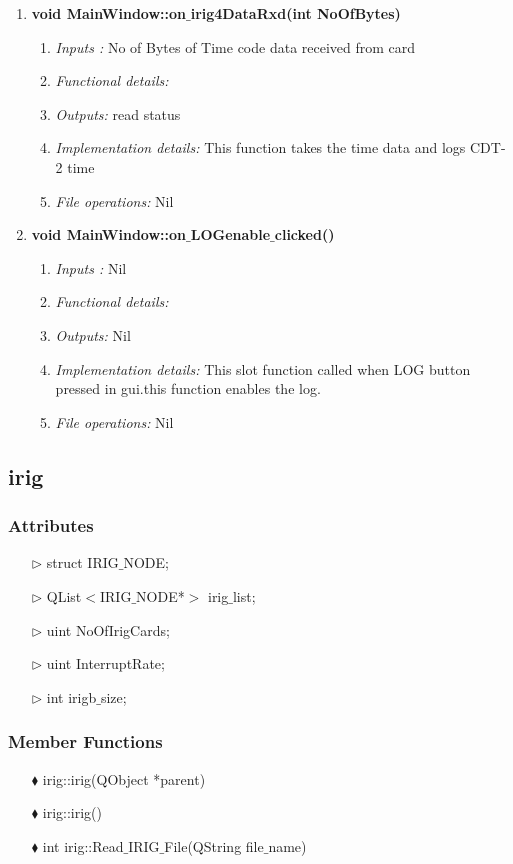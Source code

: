 \begin{enumerate}
	\item  \textbf{void MainWindow::on$\_$irig4DataRxd(int NoOfBytes)}
	\begin{enumerate}
		\item \textit{Inputs :} No of Bytes of Time code data received from card
		\item \textit{Functional details:} 
		\item \textit{Outputs:} read status 
		\item \textit{Implementation details:} This function takes the time data and logs CDT-2 time
		\item \textit{File operations:} Nil
	\end{enumerate}
	
	
	\item  \textbf{void MainWindow::on$\_$LOGenable$\_$clicked()}
	\begin{enumerate}
		\item \textit{Inputs :} Nil
		\item \textit{Functional details:} 
		\item \textit{Outputs:} Nil
		\item \textit{Implementation details:} This slot function called when LOG button pressed in gui.this function enables the log.
		\item \textit{File operations:} Nil
	\end{enumerate}
	
	

	
\end{enumerate}


\subsection{irig}
\subsubsection{Attributes}
\begin{enumerate}
\item [$\rhd$]struct IRIG$\_$NODE;
\item [$\rhd$]QList$<$IRIG$\_$NODE*$>$ irig$\_$list;
\item [$\rhd$] uint NoOfIrigCards;
\item [$\rhd$] uint InterruptRate;
\item [$\rhd$] int irigb$\_$size;

\end{enumerate}

\subsubsection{Member Functions }
\begin{enumerate}
	\item [$\blacklozenge$] irig::irig(QObject *parent)
	\item [$\blacklozenge$] irig::irig()
	\item [$\blacklozenge$] int irig::Read$\_$IRIG$\_$File(QString file$\_$name)
\end{enumerate}

